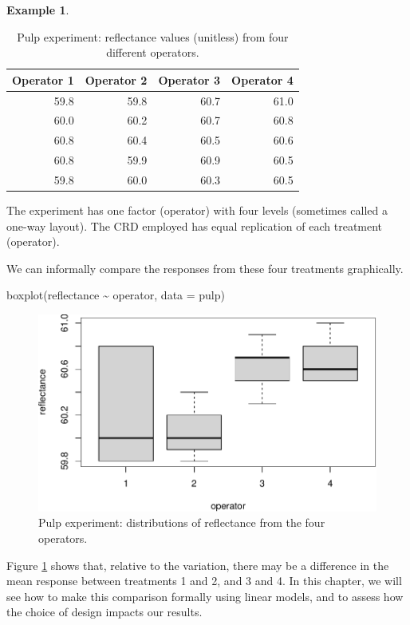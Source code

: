 \documentclass[
]{book}
\newenvironment{Shaded}{\begin{snugshade}}{\end{snugshade}}
\newcommand{\AttributeTok}[1]{\textcolor[rgb]{0.77,0.63,0.00}{#1}}
\newcommand{\FunctionTok}[1]{\textcolor[rgb]{0.00,0.00,0.00}{#1}}
\newcommand{\NormalTok}[1]{#1}
\newcommand{\SpecialCharTok}[1]{\textcolor[rgb]{0.00,0.00,0.00}{#1}}
\theoremstyle{definition}
\theoremstyle{definition}
\newtheorem{example}{Example}[chapter]
\theoremstyle{definition}
\theoremstyle{definition}
\theoremstyle{remark}
\begin{document}
\begin{example}
\begin{table}
\caption{\label{tab:pulp-expt-data}Pulp experiment: reflectance values (unitless) from four different operators.}
\centering
\begin{tabular}[t]{r|r|r|r}
\hline
Operator 1 & Operator 2 & Operator 3 & Operator 4\\
\hline
59.8 & 59.8 & 60.7 & 61.0\\
\hline
60.0 & 60.2 & 60.7 & 60.8\\
\hline
60.8 & 60.4 & 60.5 & 60.6\\
\hline
60.8 & 59.9 & 60.9 & 60.5\\
\hline
59.8 & 60.0 & 60.3 & 60.5\\
\hline
\end{tabular}
\end{table}

The experiment has one factor (operator) with four levels (sometimes called a one-way layout). The CRD employed has equal replication of each treatment (operator).

We can informally compare the responses from these four treatments graphically.

\begin{Shaded}
\begin{Highlighting}[]
\FunctionTok{boxplot}\NormalTok{(reflectance }\SpecialCharTok{\textasciitilde{}}\NormalTok{ operator, }\AttributeTok{data =}\NormalTok{ pulp)}
\end{Highlighting}
\end{Shaded}

\begin{figure}

{\centering \includegraphics{bookdown_math3014-6027_files/figure-latex/pulp-boxplot-1} 

}

\caption{Pulp experiment: distributions of reflectance from the four operators.}\label{fig:pulp-boxplot}
\end{figure}

Figure \ref{fig:pulp-boxplot} shows that, relative to the variation, there may be a difference in the mean response between treatments 1 and 2, and 3 and 4. In this chapter, we will see how to make this comparison formally using linear models, and to assess how the choice of design impacts our results.
\end{example}
\end{document}
